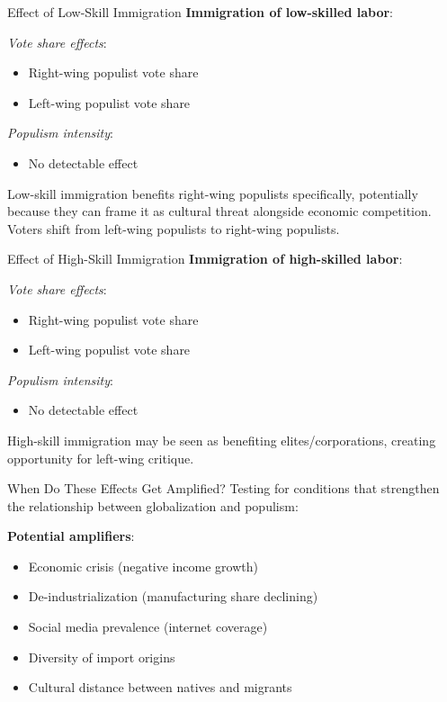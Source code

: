 \documentclass{beamer}
\begin{document}
\begin{frame}{Effect of Low-Skill Immigration}
\textbf{Immigration of low-skilled labor}:
\vspace{0.3cm}

\textit{Vote share effects}:
\begin{itemize}
    \item[$\uparrow$] Right-wing populist vote share
    \item[$\downarrow$] Left-wing populist vote share
\end{itemize}
\vspace{0.3cm}
\textit{Populism intensity}:
\begin{itemize}
    \item No detectable effect
\end{itemize}
\vspace{0.3cm}
Low-skill immigration benefits right-wing populists specifically, potentially because they can frame it as cultural threat alongside economic competition. Voters shift from left-wing populists to right-wing populists.
\end{frame}

\begin{frame}{Effect of High-Skill Immigration}
\textbf{Immigration of high-skilled labor}:
\vspace{0.3cm}

\textit{Vote share effects}:
\begin{itemize}
    \item[$\downarrow$] Right-wing populist vote share
    \item[$\uparrow$] Left-wing populist vote share
\end{itemize}
\vspace{0.3cm}
\textit{Populism intensity}:
\begin{itemize}
    \item No detectable effect
\end{itemize}
\vspace{0.3cm}
High-skill immigration may be seen as benefiting elites/corporations, creating opportunity for left-wing critique.
\end{frame}

\begin{frame}{When Do These Effects Get Amplified?}
Testing for conditions that strengthen the relationship between globalization and populism:
\vspace{0.3cm}

\textbf{Potential amplifiers}:
\begin{itemize}
    \item Economic crisis (negative income growth)
    \item De-industrialization (manufacturing share declining)
    \item Social media prevalence (internet coverage)
    \item Diversity of import origins
    \item Cultural distance between natives and migrants
\end{itemize}
\end{frame}
\end{document}
